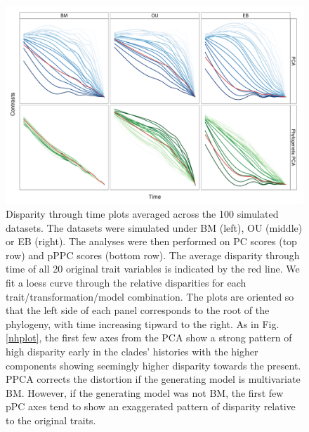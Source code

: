 \documentclass[a4paper,12pt]{article}
\begin{document}
\begin{figure}[p]
\centering
\includegraphics[scale=0.65]{./fig/dtt-2panel.pdf}
\caption{Disparity through time plots averaged across the 100 simulated datasets. The datasets were simulated under BM (left), OU (middle) or EB (right). The analyses were then performed on PC scores (top row) and pPPC scores (bottom row). The average disparity through time of all 20 original trait variables is indicated by the red line. We fit a loess curve through the relative disparities for each trait/transformation/model combination. The plots are oriented so that the left side of each panel corresponds to the root of the phylogeny, with time increasing tipward to the right. As in Fig. \ref{nhplot}, the first few axes from the PCA show a strong pattern of high disparity early in the clades' histories with the higher components showing seemingly higher disparity towards the present. PPCA corrects the distortion if the generating model is multivariate BM. However, if the generating model was not BM, the first few pPC axes tend to show an exaggerated pattern of disparity relative to the original traits.}
\label{dttplot}
\end{figure}

\renewcommand\thefigure{S\arabic{figure}}
\renewcommand\thetable{S \arabic{table}}
\setcounter{figure}{0}    
\setcounter{table}{0}
\end{document}
